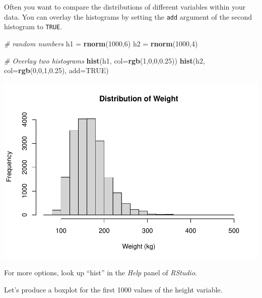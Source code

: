 \documentclass[
]{book}
\newenvironment{Shaded}{\begin{snugshade}}{\end{snugshade}}
\newcommand{\CommentTok}[1]{\textcolor[rgb]{0.56,0.35,0.01}{\textit{#1}}}
\newcommand{\DataTypeTok}[1]{\textcolor[rgb]{0.13,0.29,0.53}{#1}}
\newcommand{\DecValTok}[1]{\textcolor[rgb]{0.00,0.00,0.81}{#1}}
\newcommand{\FloatTok}[1]{\textcolor[rgb]{0.00,0.00,0.81}{#1}}
\newcommand{\KeywordTok}[1]{\textcolor[rgb]{0.13,0.29,0.53}{\textbf{#1}}}
\newcommand{\NormalTok}[1]{#1}
\newcommand{\OperatorTok}[1]{\textcolor[rgb]{0.81,0.36,0.00}{\textbf{#1}}}
\newcommand{\OtherTok}[1]{\textcolor[rgb]{0.56,0.35,0.01}{#1}}
\newcommand{\StringTok}[1]{\textcolor[rgb]{0.31,0.60,0.02}{#1}}
\begin{document}
Often you want to compare the distributions of different variables within your data. You can overlay the histograms by setting the \texttt{add} argument of the second histogram to \texttt{TRUE}.

\begin{Shaded}
\begin{Highlighting}[]
\CommentTok{# random numbers}
\NormalTok{h1 =}\StringTok{ }\KeywordTok{rnorm}\NormalTok{(}\DecValTok{1000}\NormalTok{,}\DecValTok{6}\NormalTok{)}
\NormalTok{h2 =}\StringTok{ }\KeywordTok{rnorm}\NormalTok{(}\DecValTok{1000}\NormalTok{,}\DecValTok{4}\NormalTok{)}

\CommentTok{# Overlay two histograms}
\KeywordTok{hist}\NormalTok{(h1,}
     \DataTypeTok{col=}\KeywordTok{rgb}\NormalTok{(}\DecValTok{1}\NormalTok{,}\DecValTok{0}\NormalTok{,}\DecValTok{0}\NormalTok{,}\FloatTok{0.25}\NormalTok{))}
\KeywordTok{hist}\NormalTok{(h2,}
     \DataTypeTok{col=}\KeywordTok{rgb}\NormalTok{(}\DecValTok{0}\NormalTok{,}\DecValTok{0}\NormalTok{,}\DecValTok{1}\NormalTok{,}\FloatTok{0.25}\NormalTok{),}
     \DataTypeTok{add=}\OtherTok{TRUE}\NormalTok{)}
\end{Highlighting}
\end{Shaded}

\includegraphics{_main_files/figure-latex/unnamed-chunk-128-1.pdf}

For more options, look up ``hist'' in the \emph{Help} panel of \emph{RStudio}.

Let's produce a boxplot for the first 1000 values of the height variable.

\begin{Shaded}
\end{Shaded}
\end{document}

